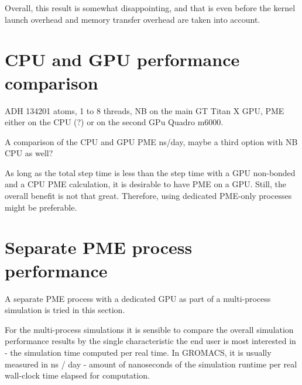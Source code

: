 \documentclass[12pt,a4paper]{report}
\newcommand{\draft}[1]{#1}
\begin{document}
\fi

Overall, this result is somewhat disappointing, and that is even before the kernel launch overhead and memory transfer overhead are taken into account.


\section {CPU and GPU performance comparison}

\draft{ADH 134201 atoms, 1 to 8 threads, NB on the main GT Titan X GPU, PME either on the CPU (?) or on the second GPu Quadro m6000}. 

\draft{A comparison of the CPU and GPU PME ns/day, maybe a third option with NB CPU as well?} 


 As long as the total step time is less than the step time with a GPU non-bonded and a CPU PME calculation, it is desirable to have PME on a GPU.  Still, the overall benefit is not that great. Therefore, using dedicated PME-only processes might be preferable.   
\iffalse

\section{Separate PME process performance}

A separate PME process with a dedicated GPU as part of a multi-process simulation is tried in this section.

For the multi-process simulations it is sensible to compare the overall simulation performance results by the single characteristic the end user is most interested in - the simulation time computed per real time. In GROMACS, it is usually measured in ns / day - amount of nanoseconds of the simulation runtime per real wall-clock time elapsed for computation.
\end{document}
